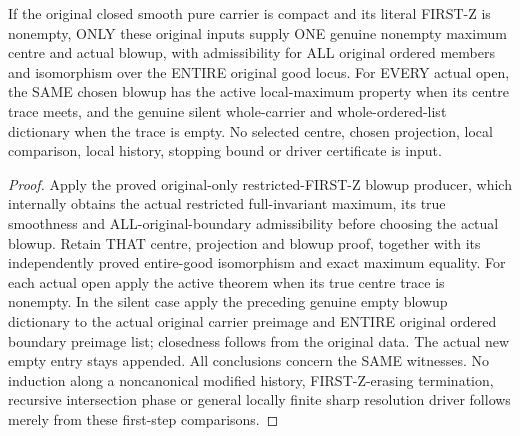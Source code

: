 \begin{theorem}
\label{hir:sharp-original-first-blowup-original-only-open-comparison}
\leanok
If the original closed smooth pure carrier is compact and its literal
FIRST-Z is nonempty, ONLY these original inputs supply ONE genuine nonempty
maximum centre and actual blowup, with admissibility for ALL original ordered
members and isomorphism over the ENTIRE original good locus. For EVERY actual
open, the SAME chosen blowup has the active local-maximum property when its
centre trace meets, and the genuine silent whole-carrier and whole-ordered-list
dictionary when the trace is empty. No selected centre, chosen projection,
local comparison, local history, stopping bound or driver certificate is input.
\end{theorem}
\begin{proof}
Apply the proved original-only restricted-FIRST-Z blowup producer, which
internally obtains the actual restricted full-invariant maximum, its true
smoothness and ALL-original-boundary admissibility before choosing the
actual blowup. Retain THAT centre, projection and blowup proof, together
with its independently proved entire-good isomorphism and exact maximum
equality. For each actual open apply the active theorem when its true centre
trace is nonempty. In the silent case apply the preceding genuine empty
blowup dictionary to the actual original carrier preimage and ENTIRE original
ordered boundary preimage list; closedness follows from the original data.
The actual new empty entry stays appended. All conclusions concern the SAME
witnesses. No induction along a noncanonical modified history, FIRST-Z-erasing
termination, recursive intersection phase or general locally finite sharp
resolution driver follows merely from these first-step comparisons.
\end{proof}
